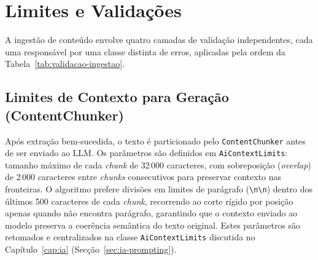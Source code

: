 \section{Limites e Validações} \label{sec:limites-ingestao}

A ingestão de conteúdo envolve quatro camadas de validação independentes, cada uma responsável por uma classe distinta de erros, aplicadas pela ordem da Tabela~\ref{tab:validacao-ingestao}.

\begin{table}[h!]
\centering
\caption{Camadas de validação da ingestão de conteúdo, por ordem de aplicação}
\label{tab:validacao-ingestao}
\end{table}

\subsection*{Limites de Contexto para Geração (ContentChunker)}

Após extração bem-sucedida, o texto é particionado pelo \texttt{ContentChunker} antes de ser enviado ao LLM.
Os parâmetros são definidos em \texttt{AiContextLimits}: tamanho máximo de cada \textit{chunk} de 32\,000 caracteres, com sobreposição (\textit{overlap}) de 2\,000 caracteres entre \textit{chunks} consecutivos para preservar contexto nas fronteiras.
O algoritmo prefere divisões em limites de parágrafo (\texttt{\textbackslash n\textbackslash n}) dentro dos últimos 500 caracteres de cada \textit{chunk}, recorrendo ao corte rígido por posição apenas quando não encontra parágrafo, garantindo que o contexto enviado ao modelo preserva a coerência semântica do texto original. Estes parâmetros são retomados e centralizados na classe \texttt{AiContextLimits} discutida no Capítulo~\ref{cap:ia} (Secção~\ref{sec:ia-prompting}).
